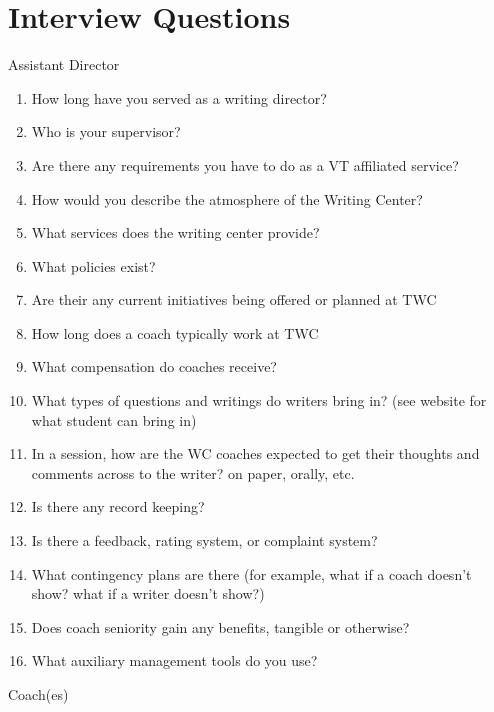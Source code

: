 \documentclass[12pt]{article} %
\begin{document}
\section{Interview Questions} %
  \begin{tabbing}
  Assistant Director
  \end{tabbing}
  \begin{enumerate} \itemsep1pt \parskip0pt 
  	\item How long have you served as a writing director?
  	\item Who is your supervisor?
  	\item Are there any requirements you have to do as a VT affiliated service?
  	\item How would you describe the atmosphere of the Writing Center?
  	\item What services does the writing center provide?
  	\item What policies exist?
  	\item Are their any current initiatives being offered or planned at TWC
  	\item How long does a coach typically work at TWC 
  	\item What compensation do coaches receive?
  	\item What types of questions and writings do writers bring in? (see website for what student can bring in)
  	\item In a session, how are the WC coaches expected to get their thoughts and comments across to the writer? {on paper, orally, etc.}
  	\item Is there any record keeping?
  	\item Is there a feedback, rating system, or complaint system?
  	\item What contingency plans are there (for example, what if a coach doesn’t show?  what if a writer doesn’t show?)
  	\item Does coach seniority gain any benefits, tangible or otherwise?
  	\item What auxiliary management tools do you use?
  \end{enumerate}
  \begin{tabbing}
  Coach(es)
  \end{tabbing}
\end{document}
